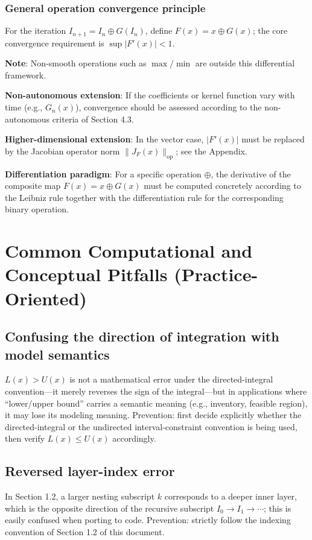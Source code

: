 \documentclass[11pt,a4paper]{amsart}
\begin{document}
\subsubsection{General operation convergence principle}

For the iteration $I_{n+1} = I_n \oplus G(I_n)$, define $F(x) = x \oplus G(x)$; the core convergence requirement is $\sup |F'(x)| < 1$.

\textbf{Note}: Non-smooth operations such as $\max/\min$ are outside this differential framework.

\textbf{Non-autonomous extension}: If the coefficients or kernel function vary with time (e.g., $G_n(x)$), convergence should be assessed according to the non-autonomous criteria of Section 4.3.

\textbf{Higher-dimensional extension}: In the vector case, $|F'(x)|$ must be replaced by the Jacobian operator norm $\|J_F(x)\|_{\mathrm{op}}$; see the Appendix.

\textbf{Differentiation paradigm}: For a specific operation $\oplus$, the derivative of the composite map $F(x) = x \oplus G(x)$ must be computed concretely according to the Leibniz rule together with the differentiation rule for the corresponding binary operation.

\section{Common Computational and Conceptual Pitfalls (Practice-Oriented)}

\subsection{Confusing the direction of integration with model semantics}
$L(x) > U(x)$ is not a mathematical error under the directed-integral convention---it merely reverses the sign of the integral---but in applications where ``lower/upper bound'' carries a semantic meaning (e.g., inventory, feasible region), it may lose its modeling meaning. Prevention: first decide explicitly whether the directed-integral or the undirected interval-constraint convention is being used, then verify $L(x) \le U(x)$ accordingly.

\subsection{Reversed layer-index error}
In Section 1.2, a larger nesting subscript $k$ corresponds to a deeper inner layer, which is the opposite direction of the recursive subscript $I_0 \to I_1 \to \cdots$; this is easily confused when porting to code. Prevention: strictly follow the indexing convention of Section 1.2 of this document.
\end{document}
